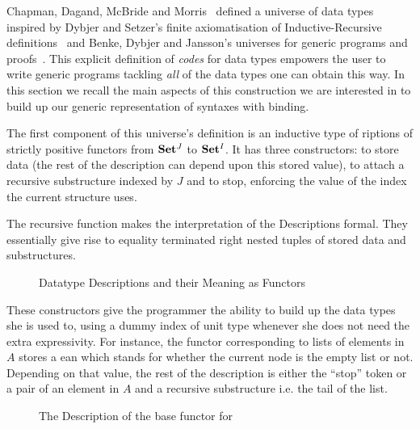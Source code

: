 Chapman, Dagand, McBride and Morris~\citeyear{Chapman:2010:GAL:1863543.1863547}
defined a universe of data types inspired by Dybjer and Setzer's
finite axiomatisation of Inductive-Recursive definitions~\citeyear{Dybjer1999}
and Benke, Dybjer and Jansson's universes for generic programs and proofs~\citeyear{benke-ugpp}.
This explicit definition of \emph{codes} for data types empowers the
user to write generic programs tackling \emph{all} of the data types
one can obtain this way. In this section we recall the main aspects
of this construction we are interested in to build up our generic
representation of syntaxes with binding.

The first component of this universe's definition is an inductive type
of riptions of strictly positive functors from $\mathbf{Set}{}^J$ to
$\mathbf{Set}{}^I$. It has three constructors:  to store data (the rest of
the description can depend upon this stored value),  to attach a
recursive substructure indexed by $J$ and  to stop, enforcing the
value of the index the current structure uses.

The recursive function  makes the interpretation of the
Descriptions formal. They essentially give rise to equality
terminated right nested tuples of stored data and substructures.

\begin{figure}[h]
\hspace{-1em}\begin{minipage}{0.50\textwidth}
\end{minipage}\hspace{2em}
\begin{minipage}{0.40\textwidth}
\end{minipage}
\caption{Datatype Descriptions and their Meaning as Functors}\label{figure:desc}
\end{figure}

These constructors give the programmer the ability to build up the data
types she is used to, using a dummy index of unit type whenever she does
not need the extra expressivity. For instance, the functor corresponding
to lists of elements in $A$ stores a ean which stands for whether
the current node is the empty list or not. Depending on that value, the
rest of the description is either the ``stop'' token or a pair of an element
in $A$ and a recursive substructure i.e. the tail of the list.

\begin{figure}[h]
\caption{The Description of the base functor for  }\label{figure:listD}
\end{figure}

